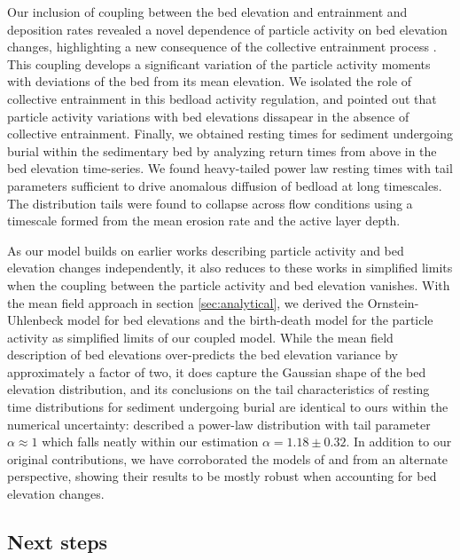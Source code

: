 Our inclusion of coupling between the bed elevation and entrainment and deposition rates revealed a novel dependence of particle activity on bed elevation changes,  highlighting a new consequence of the collective entrainment process \citep{Ancey2008,Lee2018}. This coupling develops a significant variation of the particle activity moments with deviations of the bed from its mean elevation. We isolated the role of collective entrainment in this bedload activity regulation, and pointed out that particle activity variations with bed elevations dissapear in the absence of collective entrainment.
Finally, we obtained resting times for sediment undergoing burial within the sedimentary bed by analyzing return times from above in the bed elevation time-series. We found heavy-tailed power law resting times with tail parameters sufficient to drive anomalous diffusion of bedload at long timescales.
The distribution tails were found to collapse across flow conditions using a timescale formed from the mean erosion rate and the active layer depth.

As our model builds on earlier works describing particle activity and bed elevation changes independently, it also reduces to these works in simplified limits when the coupling between the particle activity and bed elevation vanishes.
With the mean field approach in section \ref{sec:analytical}, we derived the \citet{Martin2014} Ornstein-Uhlenbeck model for bed elevations and the \citet{Ancey2008} birth-death model for the particle activity as simplified limits of our coupled model. While the mean field description of bed elevations over-predicts the bed elevation variance by approximately a factor of two, it does capture the Gaussian shape of the bed elevation distribution, and its conclusions on the tail characteristics of resting time distributions for sediment undergoing burial are identical to ours within the numerical uncertainty: \citet{Martin2014} described a power-law distribution with tail parameter $\alpha \approx 1$ which falls neatly within our estimation $\alpha = 1.18 \pm 0.32$. In addition to our original contributions, we have corroborated the models of \citet{Ancey2008} and \citet{Martin2014} from an alternate perspective, showing their results to be mostly robust when accounting for bed elevation changes.


\subsection{Next steps}

